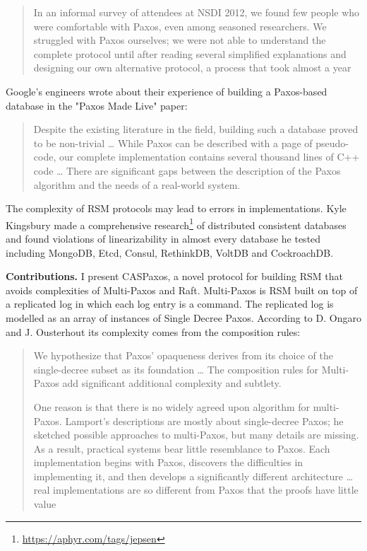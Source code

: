 \documentclass[12pt]{article}
\begin{document}
\begin{quote}
In an informal survey of attendees at NSDI 2012, we found few people who were comfortable with Paxos, even among seasoned researchers. We struggled with Paxos ourselves; we were not able to understand the complete protocol until after reading several simplified explanations and designing our own alternative protocol, a process that took almost a year
\end{quote}

Google's engineers wrote about their experience of building a Paxos-based database in the "Paxos Made Live"\cite{chubby} paper:

\begin{quote}
Despite the existing literature in the field, building such a database proved to be non-trivial \ldots{} While Paxos can be described with a page of pseudo-code, our complete implementation contains several thousand lines of C++ code \ldots{} There are significant gaps between the description of the Paxos algorithm and the needs of a real-world system.
\end{quote}

The complexity of RSM protocols may lead to errors in implementations. Kyle Kingsbury made a comprehensive research\footnote{\href{https://aphyr.com/tags/jepsen}{https://aphyr.com/tags/jepsen}} of distributed consistent databases and found violations of linearizability in almost every database he tested including MongoDB, Etcd, Consul, RethinkDB, VoltDB and CockroachDB.

{\bf Contributions.} I present CASPaxos, a novel protocol for building RSM that avoids complexities of Multi-Paxos and Raft. Multi-Paxos is RSM built on top of a replicated log in which each log entry is a command. The replicated log is modelled as an array of instances of Single Decree Paxos. According to D. Ongaro and J. Ousterhout its complexity comes from the composition rules:

\begin{quote}
We hypothesize that Paxos’ opaqueness derives from its choice of the single-decree subset as its foundation \ldots{} The composition rules for Multi-Paxos add significant additional complexity and subtlety.

One reason is that there is no widely agreed upon algorithm for multi-Paxos. Lamport’s descriptions are mostly about single-decree Paxos; he sketched possible approaches to multi-Paxos, but many details are missing. As a result, practical systems bear little resemblance to Paxos. Each implementation begins with Paxos, discovers the difficulties in implementing it, and then develops a significantly different architecture \ldots{} real implementations are so different from Paxos that the proofs have little value
\end{quote}
\end{document}
